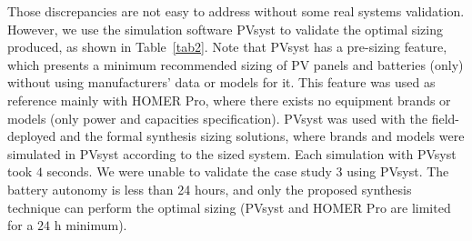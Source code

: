 \documentclass[10pt,journal,compsoc]{IEEEtran}
\begin{document}
Those discrepancies are not easy to address without some real systems validation. However, we use the simulation software PVsyst to validate the optimal sizing produced, as shown in Table~\ref{tab2}. Note that PVsyst has a pre-sizing feature, which presents a minimum recommended sizing of PV panels and batteries (only) without using manufacturers' data or models for it. This feature was used as reference mainly with HOMER Pro, where there exists no equipment brands or models (only power and capacities specification). PVsyst was used with the field-deployed and the formal synthesis sizing solutions, where brands and models were simulated in PVsyst according to the sized system. Each simulation with PVsyst took $4$ seconds. We were unable to validate the case study $3$ using PVsyst. The battery autonomy is less than 24 hours, and only the proposed synthesis technique can perform the optimal sizing (PVsyst and HOMER Pro are limited for a $24$ h minimum).  \color{black}
%
\end{document}
